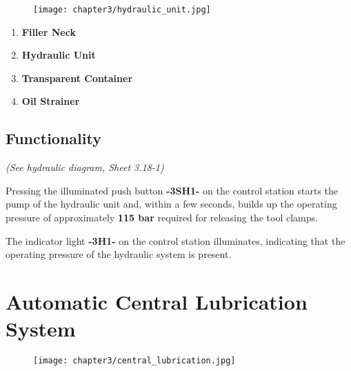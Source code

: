 \setcounter{page}{3}

\begin{figure}[h]
    \centering
    \texttt{[image: chapter3/hydraulic\_unit.jpg]}
    \label{fig:maho_hydraulic_unit}
\end{figure}

\begin{enumerate}
    \item \textbf{Filler Neck} \footnotemark
    \item \textbf{Hydraulic Unit}
    \item \textbf{Transparent Container}
    \item \textbf{Oil Strainer}
\end{enumerate}



\subsection{Functionality}  \footnotemark
{}

\textit{(See hydraulic diagram, Sheet 3.18-1)}

Pressing the illuminated push button \textbf{-3SH1-} on the control station starts the  
pump of the hydraulic unit and, within a few seconds, builds up the operating  
pressure of approximately \textbf{115 bar} required for releasing the tool clamps.  

The indicator light \textbf{-3H1-} on the control station illuminates, indicating  
that the operating pressure of the hydraulic system is present.

\section{Automatic Central Lubrication System}

\setcounter{section}{20}

\begin{figure}[h]
    \centering
    \texttt{[image: chapter3/central\_lubrication.jpg]}
    \label{fig:maho_central_lubrication}
\end{figure}

